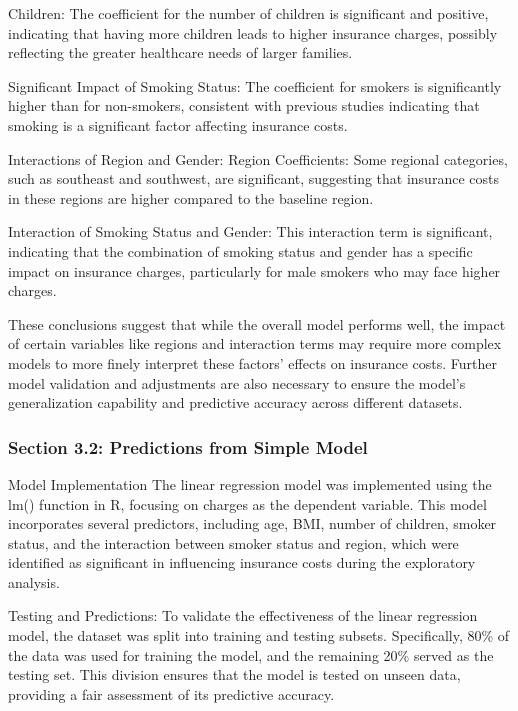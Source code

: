 \documentclass[
  12pt,
]{article}
\begin{document}
Children: The coefficient for the number of children is significant and
positive, indicating that having more children leads to higher insurance
charges, possibly reflecting the greater healthcare needs of larger
families.

Significant Impact of Smoking Status: The coefficient for smokers is
significantly higher than for non-smokers, consistent with previous
studies indicating that smoking is a significant factor affecting
insurance costs.

Interactions of Region and Gender: Region Coefficients: Some regional
categories, such as southeast and southwest, are significant, suggesting
that insurance costs in these regions are higher compared to the
baseline region.

Interaction of Smoking Status and Gender: This interaction term is
significant, indicating that the combination of smoking status and
gender has a specific impact on insurance charges, particularly for male
smokers who may face higher charges.

These conclusions suggest that while the overall model performs well,
the impact of certain variables like regions and interaction terms may
require more complex models to more finely interpret these factors'
effects on insurance costs. Further model validation and adjustments are
also necessary to ensure the model's generalization capability and
predictive accuracy across different datasets.

\subsubsection{Section 3.2: Predictions from Simple
Model}\label{section-3.2-predictions-from-simple-model}

Model Implementation The linear regression model was implemented using
the lm() function in R, focusing on charges as the dependent variable.
This model incorporates several predictors, including age, BMI, number
of children, smoker status, and the interaction between smoker status
and region, which were identified as significant in influencing
insurance costs during the exploratory analysis.

Testing and Predictions: To validate the effectiveness of the linear
regression model, the dataset was split into training and testing
subsets. Specifically, 80\% of the data was used for training the model,
and the remaining 20\% served as the testing set. This division ensures
that the model is tested on unseen data, providing a fair assessment of
its predictive accuracy.
\end{document}
